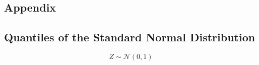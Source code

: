 \begin{multicols*}{3}
    \section{Appendix}


\end{multicols*}

\newpage{}

\begin{multicols*}{2}

    \subsection{Quantiles of the Standard Normal Distribution}
    \noindent\begin{equation*}
        Z\sim\mathcal{N}(0,1)
    \end{equation*}

    \setlength{\oldtabcolsep}{\tabcolsep}\setlength\tabcolsep{5pt}


\end{multicols*}
